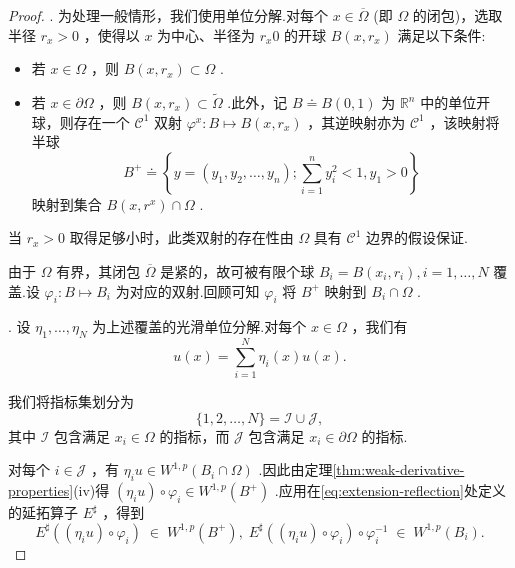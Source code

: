 \begin{proof}
. 为处理一般情形，我们使用单位分解.对每个 $x \in  \overline{\Omega }$ (即 $\Omega$ 的闭包)，选取半径 ${r}_{x} > 0$ ，使得以 $x$ 为中心、半径为 ${r}_{x}0$ 的开球 $B\left( {x,{r}_{x}}\right)$ 满足以下条件:
\begin{itemize}
\item 若 $x \in  \Omega$ ，则 $B\left( {x,{r}_{x}}\right)  \subset  \Omega$ .
\item 若 $x \in  \partial \Omega$ ，则 $B\left( {x,{r}_{x}}\right)  \subset  \widetilde{\Omega }$ .此外，记 $B \doteq  B\left( {0,1}\right)$ 为 ${\mathbb{R}}^{n}$ 中的单位开球，则存在一个 ${\mathcal{C}}^{1}$ 双射 ${\varphi }^{x} : B \mapsto  B\left( {x,{r}_{x}}\right)$ ，其逆映射亦为 ${\mathcal{C}}^{1}$ ，该映射将半球
\[
{B}^{ + } \doteq  \left\{  {y = \left( {{y}_{1},{y}_{2},\ldots ,{y}_{n}}\right) ;\sum_{{i = 1}}^{n}{y}_{i}^{2} < 1,{y}_{1} > 0}\right\}
\]
映射到集合 $B\left( {x,{r}^{x}}\right)  \cap  \Omega$ .
\end{itemize}


当 ${r}_{x} > 0$ 取得足够小时，此类双射的存在性由 $\Omega$ 具有 ${\mathcal{C}}^{1}$ 边界的假设保证.

由于 $\Omega$ 有界，其闭包 $\overline{\Omega }$ 是紧的，故可被有限个球 ${B}_{i} = B\left( {{x}_{i},{r}_{i}}\right) ,i = 1,\ldots ,N$ 覆盖.设 ${\varphi }_{i} : B \mapsto  {B}_{i}$ 为对应的双射.回顾可知 ${\varphi }_{i}$ 将 ${B}^{ + }$ 映射到 ${B}_{i} \cap  \Omega$ .

. 设 ${\eta }_{1},\ldots ,{\eta }_{N}$ 为上述覆盖的光滑单位分解.对每个 $x \in  \Omega$ ，我们有
\begin{equation}\tag{8.41}\label{eq:partition-unity-u}
u\left( x\right)  = \sum_{{i = 1}}^{N}{\eta }_{i}\left( x\right) u\left( x\right) .
\end{equation}

我们将指标集划分为
\[
\{ 1,2,\ldots ,N\}  = \mathcal{I} \cup  \mathcal{J},
\]
其中 $\mathcal{I}$ 包含满足 ${x}_{i} \in  \Omega$ 的指标，而 $\mathcal{J}$ 包含满足 ${x}_{i} \in  \partial \Omega$ 的指标.

对每个 $i \in  \mathcal{J}$ ，有 ${\eta }_{i}u \in  {W}^{1,p}\left( {{B}_{i} \cap  \Omega }\right)$ .因此由定理\ref{thm:weak-derivative-properties}(iv)得 $\left( {{\eta }_{i}u}\right)  \circ  {\varphi }_{i} \in  {W}^{1,p}\left( {B}^{ + }\right)$ .应用在\eqref{eq:extension-reflection}处定义的延拓算子 ${E}^{\sharp }$ ，得到
\[
{E}^{\sharp }\left( {\left( {{\eta }_{i}u}\right)  \circ  {\varphi }_{i}}\right) \; \in  \;{W}^{1,p}\left( {B}^{ + }\right) ,\;{E}^{\sharp }\left( {\left( {{\eta }_{i}u}\right)  \circ  {\varphi }_{i}}\right)  \circ  {\varphi }_{i}^{-1}\; \in  \;{W}^{1,p}\left( {B}_{i}\right) .
\]


\end{proof}
